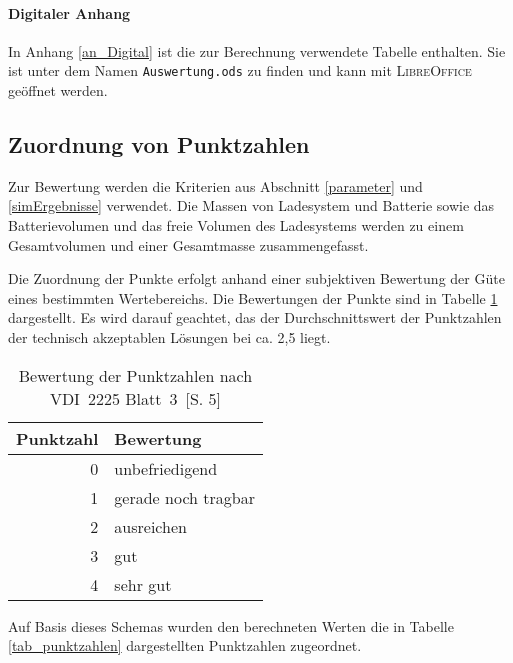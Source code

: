 \paragraph{Digitaler Anhang} In Anhang \ref{an_Digital} ist die zur Berechnung verwendete Tabelle enthalten. Sie ist unter dem Namen \texttt{Auswertung.ods} zu finden und kann mit \textsc{LibreOffice} geöffnet werden.

\subsection{Zuordnung von Punktzahlen}
Zur Bewertung werden die Kriterien aus Abschnitt \ref{parameter} und \ref{simErgebnisse} verwendet. Die Massen von Ladesystem und Batterie sowie das Batterievolumen und das freie Volumen des Ladesystems werden zu einem Gesamtvolumen und einer Gesamtmasse zusammengefasst.

Die Zuordnung der Punkte erfolgt anhand einer subjektiven Bewertung der Güte eines bestimmten Wertebereichs. Die Bewertungen der Punkte sind in Tabelle \ref{tabPunkte} dargestellt. Es wird darauf geachtet, das der Durchschnittswert der Punktzahlen der technisch akzeptablen Lösungen bei ca. 2,5 liegt.

\begin{table} \centering
	\begin{tabular}{rl}
		\toprule
		Punktzahl & Bewertung           \\ \midrule
		        0 & unbefriedigend      \\
		        1 & gerade noch tragbar \\
		        2 & ausreichen          \\
		        3 & gut                 \\
		        4 & sehr gut            \\ \bottomrule
	\end{tabular}
	\caption[Bewertung der Punktzahlen]{Bewertung der Punktzahlen nach VDI~2225 Blatt~3~\cite{vdi:2225}[S. 5]}
	\label{tabPunkte}
\end{table}

Auf Basis dieses Schemas wurden den berechneten Werten die in Tabelle \ref{tab_punktzahlen} dargestellten Punktzahlen zugeordnet.

